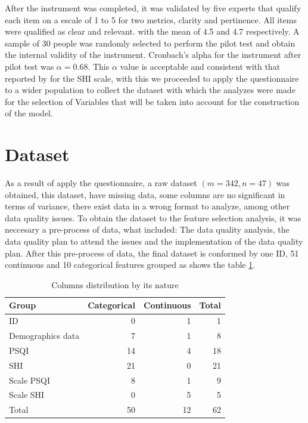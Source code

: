 \documentclass[]{book}
\begin{document}
After the instrument was completed, it was validated by five experts
that qualify each item on a escale of 1 to 5 for two metrics, clarity
and pertinence. All items were qualified as clear and relevant. with the
mean of 4.5 and 4.7 respectively. A sample of 30 people was randomly
selected to perform the pilot test and obtain the internal validity of
the instrument. Cronbach's alpha for the instrument after pilot test was
\(\alpha=0.68\). This \(\alpha\) value is acceptable and consistent with
that reported by \citep{mastin2006} for the SHI scale, with this we
proceeded to apply the questionnaire to a wider population to collect
the dataset with which the analyzes were made for the selection of
Variables that will be taken into account for the construction of the
model.

\section{Dataset}\label{dataset}

As a result of apply the questionnaire, a raw dataset \((m=342, n=47)\)
was obtained, this dataset, have missing data, some columns are no
significant in terms of variance, there exist data in a wrong format to
analyze, among other data quality issues. To obtain the dataset to the
feature selection analysis, it was neccesary a pre-process of data, what
included: The data quality analysis, the data quality plan to attend the
issues and the implementation of the data quality plan. After this
pre-process of data, the final dataset is conformed by one ID, 51
continuous and 10 categorical features grouped as shows the table
\ref{tab:dataset-columns-distribution}.

\begin{table}[ht]
\centering
\caption{Columns distribution by its nature}
\label{tab:dataset-columns-distribution}
\begin{tabular}{lrrr}
\hline
Group             & Categorical & Continuous & Total \\ \hline
ID                & 0           & 1          & 1     \\
Demographics data & 7           & 1          & 8     \\
PSQI              & 14          & 4          & 18    \\
SHI               & 21          & 0          & 21    \\
Scale PSQI        & 8           & 1          & 9     \\
Scale SHI         & 0           & 5          & 5     \\ \hline
Total             & 50          & 12         & 62    \\ \hline
\end{tabular}
\end{table}
\end{document}
